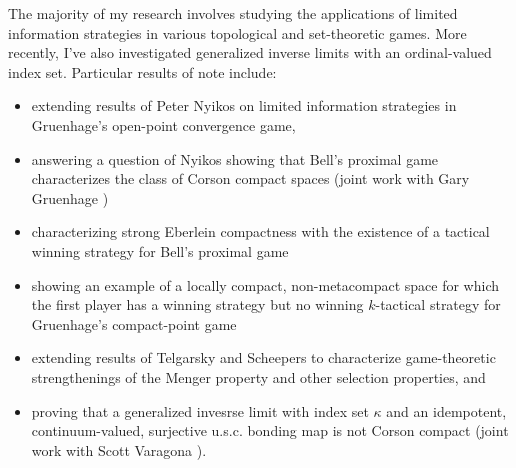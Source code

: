 \documentclass[11pt]{amsart}
\theoremstyle{plain}
\newcommand{\<}{\langle}
\renewcommand{\>}{\rangle}
\newcommand{\term}{\textit}
\begin{document}
The majority of my research involves studying the applications of
limited information strategies in various topological and set-theoretic
games. More recently,
I've also investigated generalized inverse limits with an ordinal-valued
index set. Particular results of note include:
  \begin{itemize}
    \item extending results of Peter Nyikos \cite{MR1031771} on limited
          information strategies in Gruenhage's open-point convergence game,
    \item answering a question of Nyikos \cite{MR3288115} showing
          that Bell's proximal game characterizes the class of Corson compact
          spaces (joint work with Gary Gruenhage \cite{MR3227201})
    \item characterizing strong Eberlein compactness with the existence of
          a tactical winning strategy for Bell's proximal game
          \cite{tacticProximal}
    \item showing an example of a locally compact, non-metacompact space for
          which the first player has a winning strategy but no winning
          $k$-tactical strategy for Gruenhage's compact-point game
          \cite{ktacticsCompactOpen}
    \item extending results of Telgarsky \cite{MR753073} and Scheepers
          \cite{MR1273523} to characterize
          game-theoretic strengthenings of the Menger property and other
          selection properties, and
    \item proving that a generalized invesrse limit with index set \(\kappa\)
          and an idempotent, continuum-valued, surjective u.s.c. bonding map
          is not Corson compact (joint work with Scott Varagona
          \cite{destroyMetrizability}).
  \end{itemize}


\end{document}
